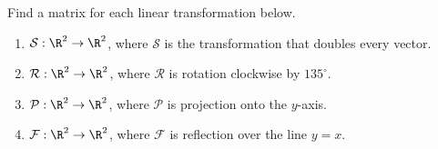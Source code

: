 \begin{exercises}
	\begin{problist}
		\prob Find a matrix for each linear transformation below.
		\begin{enumerate}
			\item $\mathcal S:\R^{2}\to\R^{2}$, where $\mathcal S$ is the
				transformation that doubles every vector.

			\item $\mathcal R:\R^{2}\to\R^{2}$, where $\mathcal R$
				is rotation clockwise by $135^{\circ}$.

			\item $\mathcal P:\R^{2}\to\R^{2}$, where $\mathcal P$
				is projection onto the $y$-axis.

			\item $\mathcal F:\R^{2}\to\R^{2}$, where $\mathcal F$
				is reflection over the line
				$y=x$.
		\end{enumerate}
	\end{problist}
\end{exercises}
